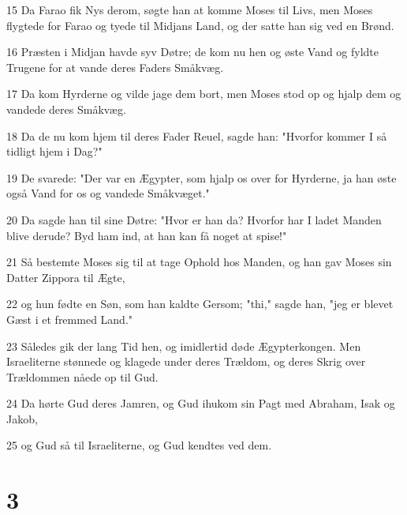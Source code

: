 \par 15 Da Farao fik Nys derom, søgte han at komme Moses til Livs, men Moses flygtede for Farao og tyede til Midjans Land, og der satte han sig ved en Brønd.
\par 16 Præsten i Midjan havde syv Døtre; de kom nu hen og øste Vand og fyldte Trugene for at vande deres Faders Småkvæg.
\par 17 Da kom Hyrderne og vilde jage dem bort, men Moses stod op og hjalp dem og vandede deres Småkvæg.
\par 18 Da de nu kom hjem til deres Fader Reuel, sagde han: "Hvorfor kommer I så tidligt hjem i Dag?"
\par 19 De svarede: "Der var en Ægypter, som hjalp os over for Hyrderne, ja han øste også Vand for os og vandede Småkvæget."
\par 20 Da sagde han til sine Døtre: "Hvor er han da? Hvorfor har I ladet Manden blive derude? Byd ham ind, at han kan få noget at spise!"
\par 21 Så bestemte Moses sig til at tage Ophold hos Manden, og han gav Moses sin Datter Zippora til Ægte,
\par 22 og hun fødte en Søn, som han kaldte Gersom; "thi," sagde han, "jeg er blevet Gæst i et fremmed Land."
\par 23 Således gik der lang Tid hen, og imidlertid døde Ægypterkongen. Men Israeliterne stønnede og klagede under deres Trældom, og deres Skrig over Trældommen nåede op til Gud.
\par 24 Da hørte Gud deres Jamren, og Gud ihukom sin Pagt med Abraham, Isak og Jakob,
\par 25 og Gud så til Israeliterne, og Gud kendtes ved dem.

\chapter{3}

